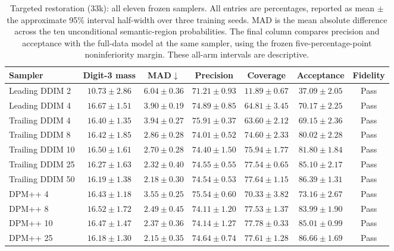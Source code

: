 \begin{table}[t]
\centering\footnotesize
\setlength{\tabcolsep}{3.5pt}
\caption{Targeted restoration (33k): all eleven frozen samplers. All entries are percentages, reported as mean $\pm$ the approximate 95\% interval half-width over three training seeds. MAD is the mean absolute difference across the ten unconditional semantic-region probabilities. The final column compares precision and acceptance with the full-data model at the same sampler, using the frozen five-percentage-point noninferiority margin. These all-arm intervals are descriptive.}
\label{tab:mnist_all_targeted_restore}
\begin{tabular}{lcccccc}
\toprule
Sampler & Digit-3 mass & MAD$\downarrow$ & Precision & Coverage & Acceptance & Fidelity \\
\midrule
Leading DDIM 2 & $10.73\pm2.86$ & $6.04\pm0.36$ & $71.21\pm0.93$ & $11.89\pm0.67$ & $37.09\pm2.05$ & Pass \\
Leading DDIM 4 & $16.67\pm1.51$ & $3.90\pm0.19$ & $74.89\pm0.85$ & $64.81\pm3.45$ & $70.17\pm2.25$ & Pass \\
Trailing DDIM 4 & $16.40\pm1.35$ & $3.94\pm0.27$ & $75.91\pm0.37$ & $63.60\pm2.12$ & $69.15\pm2.36$ & Pass \\
Trailing DDIM 8 & $16.42\pm1.85$ & $2.86\pm0.28$ & $74.01\pm0.52$ & $74.60\pm2.33$ & $80.02\pm2.28$ & Pass \\
Trailing DDIM 10 & $16.50\pm1.61$ & $2.70\pm0.28$ & $74.40\pm1.50$ & $75.94\pm1.77$ & $81.80\pm1.84$ & Pass \\
Trailing DDIM 25 & $16.27\pm1.63$ & $2.32\pm0.40$ & $74.55\pm0.55$ & $77.54\pm0.65$ & $85.10\pm2.17$ & Pass \\
Trailing DDIM 50 & $16.19\pm1.38$ & $2.18\pm0.30$ & $74.54\pm0.53$ & $77.64\pm1.15$ & $86.39\pm1.31$ & Pass \\
DPM++ 4 & $16.43\pm1.18$ & $3.55\pm0.25$ & $75.54\pm0.60$ & $70.33\pm3.82$ & $73.16\pm2.67$ & Pass \\
DPM++ 8 & $16.52\pm1.72$ & $2.49\pm0.45$ & $74.11\pm1.20$ & $77.53\pm1.37$ & $83.99\pm1.90$ & Pass \\
DPM++ 10 & $16.47\pm1.47$ & $2.37\pm0.36$ & $74.14\pm1.27$ & $77.78\pm0.33$ & $85.01\pm0.99$ & Pass \\
DPM++ 25 & $16.18\pm1.30$ & $2.15\pm0.35$ & $74.64\pm0.74$ & $77.61\pm1.28$ & $86.66\pm1.69$ & Pass \\
\bottomrule
\end{tabular}
\end{table}

